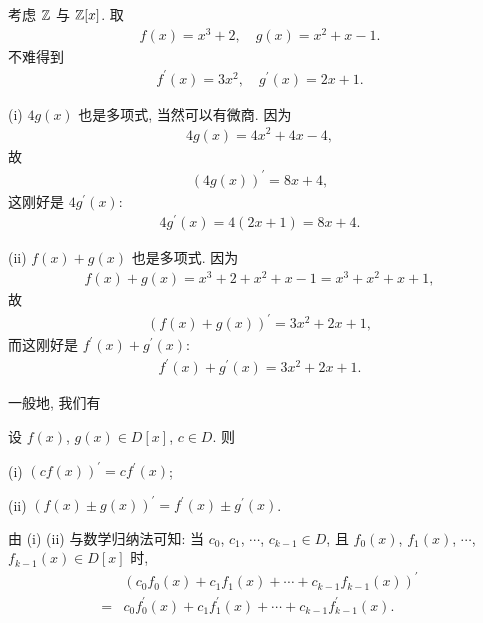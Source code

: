 \begin{example}
    考虑 $\mathbb{Z}$ 与 $\mathbb{Z}[x]$. 取
    \begin{align*}
        f(x) = x^3 + 2, \quad g(x) = x^2 + x - 1.
    \end{align*}
    不难得到
    \begin{align*}
        f^{\prime} (x) = 3x^2, \quad g^{\prime} (x) = 2x + 1.
    \end{align*}

    (i) $4g(x)$ 也是多项式, 当然可以有微商. 因为
    \begin{align*}
        4g(x) = 4x^2 + 4x - 4,
    \end{align*}
    故
    \begin{align*}
        (4g(x))^{\prime} = 8x + 4,
    \end{align*}
    这刚好是 $4g^{\prime} (x)$:
    \begin{align*}
        4g^{\prime} (x) = 4(2x + 1) = 8x + 4.
    \end{align*}

    (ii) $f(x) + g(x)$ 也是多项式. 因为
    \begin{align*}
        f(x) + g(x) = x^3 + 2 + x^2 + x - 1 = x^3 + x^2 + x + 1,
    \end{align*}
    故
    \begin{align*}
        (f(x) + g(x))^{\prime} = 3x^2 + 2x + 1,
    \end{align*}
    而这刚好是 $f^{\prime} (x) + g^{\prime} (x)$:
    \begin{align*}
        f^{\prime} (x) + g^{\prime} (x) = 3x^2 + 2x + 1.
    \end{align*}
\end{example}

一般地, 我们有

\begin{proposition}
    设 $f(x)$, $g(x) \in D[x]$, $c \in D$. 则

    (i) $(cf(x))^{\prime} = c f^{\prime} (x)$;

    (ii) $(f(x) \pm g(x))^{\prime} = f^{\prime} (x) \pm g^{\prime} (x)$.

    由 (i) (ii) 与数学归纳法可知: 当 $c_0$, $c_1$, $\cdots$, $c_{k-1} \in D$, 且 $f_0 (x)$, $f_1 (x)$, $\cdots$, $f_{k-1} (x) \in D[x]$ 时,
    \begin{align*}
             & (c_0 f_0(x) + c_1 f_1(x) + \cdots + c_{k-1} f_{k-1}(x))^{\prime}                  \\
        = {} & c_0 f^{\prime}_0(x) + c_1 f^{\prime}_1(x) + \cdots + c_{k-1} f^{\prime}_{k-1}(x).
    \end{align*}
\end{proposition}


